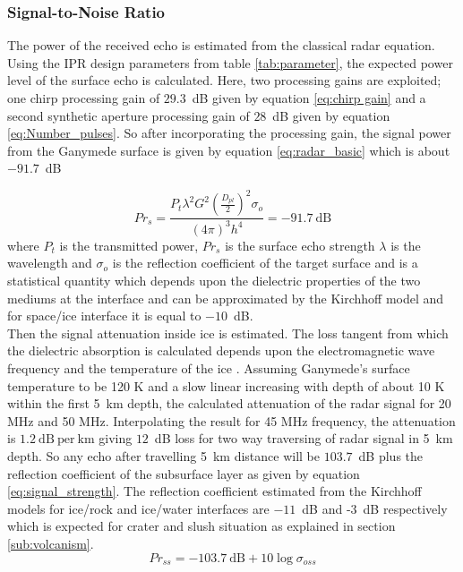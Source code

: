 \subsubsection{Signal-to-Noise Ratio}

The power of the received echo is estimated from the classical radar equation. Using the \ac{IPR} design parameters from table \ref{tab:parameter}, the expected power level of the surface echo is calculated. Here, two processing gains are exploited; one chirp processing gain of $29.3$~dB given by equation \ref{eq:chirp gain} and a second synthetic aperture processing gain of $28$~dB given by equation \ref{eq:Number_pulses}. So after incorporating the processing gain, the signal power from the Ganymede surface is given by equation \ref{eq:radar_basic} which is about $-91.7$~dB

\begin{equation}
Pr_{s} = \dfrac{P_{t}\lambda^{2}G^{2}(\frac{D_{pl}}{2})^{2}\sigma_{o}}{(4\pi)^{3}h^{4}} 
	  = -91.7 \mathrm{~dB} 
\label{eq:radar_basic}
\end{equation}
where $P_{t}$ is the transmitted power, $Pr_{s}$ is the surface echo strength $\lambda$ is the wavelength  and $\sigma_{o}$ is the reflection coefficient of the target surface and is a statistical quantity which depends upon the dielectric properties of the two mediums at the interface and can be approximated by the Kirchhoff model \cite{MIMOSA} and for space/ice interface it is equal to $-10$~dB.\\
%
Then the signal attenuation inside ice is estimated. The loss tangent from which the dielectric absorption is calculated depends upon the electromagnetic wave frequency and the temperature of the ice \cite{MIMOSA}. Assuming Ganymede's surface temperature to be 120 K and a slow linear increasing with depth of about 10 K within the first 5~km depth\cite{Gany_SRS}, the calculated attenuation of the radar signal for 20 MHz and 50 MHz. Interpolating the result for 45 MHz frequency, the attenuation is $1.2 \mathrm{~dB~per~km}$ giving $12$~dB loss for two way traversing of radar signal in 5~km depth. So any echo after travelling 5~km distance will be $103.7$~dB plus the reflection coefficient of the subsurface layer as given by equation \ref{eq:signal_strength}. The reflection coefficient estimated from the Kirchhoff models for ice/rock and ice/water interfaces are $-11$~dB and -3~dB respectively which is expected for  crater and slush situation as explained in section \ref{sub:volcanism}.
%
\begin{equation}
Pr_{ss} = -103.7 \mathrm{~dB} + 10 \log \sigma_{oss}
\label{eq:signal_strength}
\end{equation}
